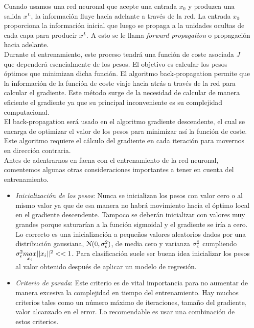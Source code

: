     Cuando usamos una red neuronal que acepte una entrada $x_0$ y produzca una salida $x^L$, la información fluye hacia adelante a través de la red. La entrada $x_0$ proporciona la información inicial que luego se propaga a la unidades ocultas de cada capa para producir $x^L$. A esto se le llama \textit{forward propagation} o propagación hacia adelante. \\
    
    Durante el entrenamiento, este proceso tendrá una función de coste asociada $J$ que dependerá esencialmente de los pesos. El objetivo es calcular los pesos óptimos que minimizan dicha función. El algoritmo back-propagation permite que la información de la función de coste viaje hacia atrás a través de la red para calcular el gradiente. Este método surge de la necesidad de calcular de manera eficiente el gradiente ya que su principal inconveniente es su complejidad computacional. \\
    
    El back-propagation será usado en el algoritmo gradiente descendente, el cual se encarga de optimizar el valor de los pesos para minimizar así la función de coste. Este algoritmo requiere el cálculo del gradiente en cada iteración para movernos en dirección contraria. \\
    
    
    Antes de adentrarnos en faena con el entrenamiento de la red neuronal, comentemos algunas otras consideraciones importantes a tener en cuenta del entrenamiento. 
    \begin{itemize}
        \item \textit{Inicialización de los pesos}: Nunca se inicializan los pesos con valor cero o al mismo valor ya que de esa manera no habrá movimiento hacia el óptimo local en el gradiente descendente. Tampoco se deberán inicializar con valores muy grandes porque saturarían a la función sigmoidal y el gradiente se iría a cero. Lo correcto es una inicialización a pequeños valores aleatorios dados por una distribución gaussiana, $\mathcal{N}(0,\sigma_{\epsilon}^2)$, de media cero y varianza $\sigma_{\epsilon}^2$ cumpliendo $\sigma_{\epsilon}^2 \underset{x_i}{max} || x_i||^2 << 1$. Para clasificación suele ser buena idea inicializar los pesos al valor obtenido después de aplicar un modelo de regresión. \\
        \item \textit{Criterio de parada}: Este criterio es de vital importancia para no aumentar de manera excesiva la complejidad en tiempo del entrenamiento. Hay muchos criterios tales como un número máximo de iteraciones, tamaño del gradiente, valor alcanzado en el error. Lo recomendable es usar una combinación de estos criterios.
    \end{itemize}
    
